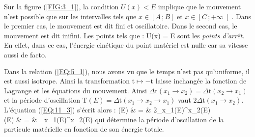 Sur la figure (\ref{FIG:3_1}), la condition $U(x)<E$ implique que le mouvement n'est possible que sur les intervalles tels que $x\in\left[A\,;B\right]$ et $x\in\left[C\,;+\infty\right[$. Dans le premier cas, le mouvement est dit fini et oscillatoire. Dans le second cas, le mouvement est dit inifini. Les points tels que :
\be
	U(x) = E \label{EQ:11_4}
\ee
sont les \emph{points d'arr\^et}. En effet, dans ce cas, l'\'energie cin\'etique du point mat\'eriel est nulle car sa vitesse aussi de facto.

Dans la relation (\ref{EQ:5_1}), nous avons vu que le temps n'est pas qu'uniforme, il est aussi isotrope. Ainsi la transformation $\mathrm{t}\mapsto -\mathrm{t}$ laisse inchang\'ee la fonction de Lagrange et les \'equations du mouvement. Ainsi $\Delta\mathrm{t}(x_{1}\rightarrow x_{2}) = \Delta\mathrm{t}(x_{2}\rightarrow x_{1})$ et la période d'oscillation $\mathrm{T}(E)=\Delta\mathrm{t}(x_{1}\rightarrow x_{2}\rightarrow x_{1})$ vaut $2\Delta\mathrm{t}(x_{1}\rightarrow x_{2})$. L'\'equation (\ref{EQ:11_3}) s'\'ecrit alors :
\bea
	(E) & = & 2\int_{x_{1}(E)}^{x_{2}(E)}{} \nonumber \\
	(E) & = & \int_{x_{1}(E)}^{x_{2}(E)}{}\label{EQ:11_5}
\eea
qui d\'etermine la p\'eriode d'oscillation de la particule mat\'erielle en fonction de son \'energie totale.